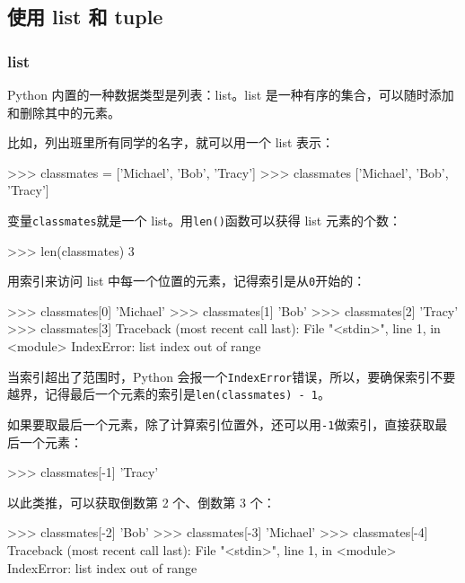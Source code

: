 \hypertarget{ux4f7fux7528-list-ux548c-tuple}{%
\subsection{使用 list 和 tuple}\label{ux4f7fux7528-list-ux548c-tuple}}

\hypertarget{list}{%
\subsubsection{list}\label{list}}

Python 内置的一种数据类型是列表：list。list
是一种有序的集合，可以随时添加和删除其中的元素。

比如，列出班里所有同学的名字，就可以用一个 list 表示：

\begin{pythoncode}
>>> classmates = ['Michael', 'Bob', 'Tracy']
>>> classmates
['Michael', 'Bob', 'Tracy']
\end{pythoncode}

变量\texttt{classmates}就是一个 list。用\texttt{len()}函数可以获得 list
元素的个数：

\begin{pythoncode}
>>> len(classmates)
3
\end{pythoncode}

用索引来访问 list 中每一个位置的元素，记得索引是从\texttt{0}开始的：

\begin{pythoncode}
>>> classmates[0]
'Michael'
>>> classmates[1]
'Bob'
>>> classmates[2]
'Tracy'
>>> classmates[3]
Traceback (most recent call last):
  File "<stdin>", line 1, in <module>
IndexError: list index out of range
\end{pythoncode}

当索引超出了范围时，Python
会报一个\texttt{IndexError}错误，所以，要确保索引不要越界，记得最后一个元素的索引是\texttt{len(classmates)\ -\ 1}。

如果要取最后一个元素，除了计算索引位置外，还可以用\texttt{-1}做索引，直接获取最后一个元素：

\begin{pythoncode}
>>> classmates[-1]
'Tracy'
\end{pythoncode}

以此类推，可以获取倒数第 2 个、倒数第 3 个：

\begin{pythoncode}
>>> classmates[-2]
'Bob'
>>> classmates[-3]
'Michael'
>>> classmates[-4]
Traceback (most recent call last):
  File "<stdin>", line 1, in <module>
IndexError: list index out of range
\end{pythoncode}

